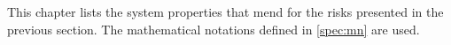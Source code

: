 

This chapter lists the system properties that mend for the risks presented in the previous section. The mathematical notations defined in \ref{spec:mn} are used.

